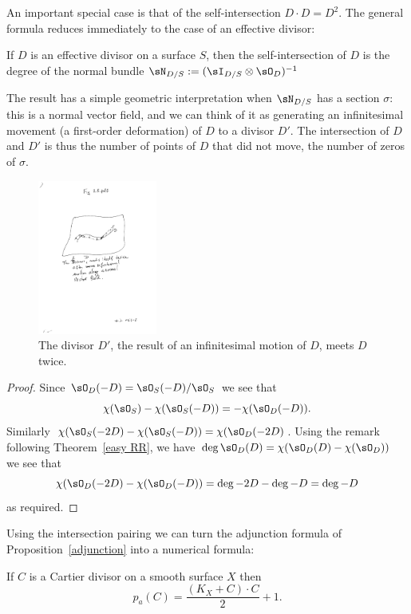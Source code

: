 An important special case is that of the self-intersection $D\cdot D = D^2$. The general formula reduces immediately to the case of an effective divisor:

\begin{corollary}\label{self-intersection number}
If $D$ is an effective divisor on a surface $S$, then the self-intersection of $D$ is the degree of the normal bundle
$\sN_{D/S} := (\sI_{D/S}\otimes \sO_D)^{-1}$
\end{corollary}

The result has a simple geometric interpretation when $\sN_{D/S}$ has a section $\sigma$: this is a normal vector field,
and we can think of it as generating an infinitesimal movement (a first-order deformation) of $D$ to a divisor $D'$.
The intersection of $D$ and $D'$ is thus the number of points of $D$ that did not move, the number  of zeros of $\sigma$.

\begin{figure}
 \caption{The divisor $D'$, the result of an infinitesimal motion of $D$, meets $D$ twice. }
\centerline {\includegraphics[height=2in]{"Fig2.3.pdf"}}
\end{figure}

\begin{proof}
Since $\sO_D(-D) = \sO_S(-D)/\sO_S$ we see that 
$$
\chi(\sO_S)-\chi(\sO_S(-D)) = -\chi(\sO_D(-D)).
$$
Similarly $\chi(\sO_S(-2D) - \chi(\sO_S(-D)) = \chi(\sO_D(-2D)$. Using the remark following Theorem~\ref{easy RR},
we have $\deg \sO_D(D) = \chi(\sO_D(D) - \chi(\sO_D))$ we see
that
$$
\chi(\sO_D(-2D) -\chi(\sO_D(-D)) = \deg -2D - \deg -D = \deg -D
$$
as required.
\end{proof}

Using the intersection pairing we can turn the adjunction formula of Proposition~\ref{adjunction} into a numerical formula:

\begin{theorem}\label{adjunction formula} 
If $C$ is a Cartier divisor on a smooth surface $X$ then\label{genus formula}
$$
p_a(C) = \frac{(K_X+C)\cdot C}{2} +1.
 $$
\end{theorem}


